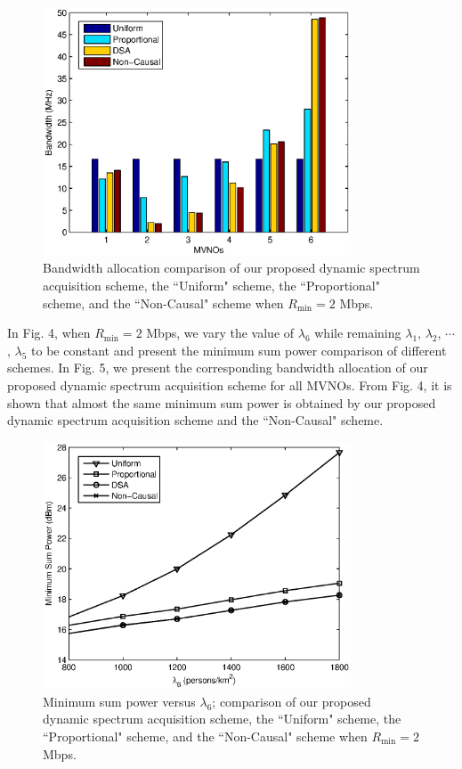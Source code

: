 \documentclass[journal]{IEEEtran}
\begin{document}
\begin{figure}
\centering
\includegraphics[width=3.6in]{fig3.eps}
\caption{Bandwidth allocation comparison of our proposed dynamic spectrum acquisition scheme, the ``Uniform" scheme, the ``Proportional" scheme, and the ``Non-Causal" scheme when $R_{\min}=2$ Mbps.}
\end{figure}

In Fig. 4, when $R_{\min}=2$ Mbps, we vary the value of $\lambda_6$ while remaining $\lambda_1$, $\lambda_2$, $\cdots$, $\lambda_5$ to be constant and present the minimum sum power comparison of different schemes. In Fig. 5, we present the corresponding bandwidth allocation of our proposed dynamic spectrum acquisition scheme for all MVNOs. From Fig. 4, it is shown that almost the same minimum sum power is obtained by our proposed dynamic spectrum acquisition scheme and the ``Non-Causal" scheme.

\begin{figure}
\centering
\includegraphics[width=3.6in]{fig4.eps}
\caption{Minimum sum power versus $\lambda_6$; comparison of our proposed dynamic spectrum acquisition scheme, the ``Uniform" scheme, the ``Proportional" scheme, and the ``Non-Causal" scheme when $R_{\min}=2$ Mbps.}
\end{figure}
\end{document}
